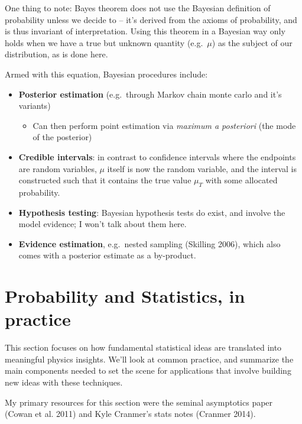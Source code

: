 \documentclass[
  11pt,
  numbers=noendperiod]{book}
\providecommand{\tightlist}{%
  \setlength{\itemsep}{0pt}\setlength{\parskip}{0pt}}\usepackage{longtable,booktabs,array}
\begin{document}
One thing to note: Bayes theorem does not use the Bayesian definition of
probability unless we decide to -- it's derived from the axioms of
probability, and is thus invariant of interpretation. Using this theorem
in a Bayesian way only holds when we have a true but unknown quantity
(e.g.~\(\mu\)) as the subject of our distribution, as is done here.

Armed with this equation, Bayesian procedures include:

\begin{itemize}
\tightlist
\item
  \textbf{Posterior estimation} (e.g.~through Markov chain monte carlo
  and it's variants)

  \begin{itemize}
  \tightlist
  \item
    Can then perform point estimation via \emph{maximum a posteriori}
    (the mode of the posterior)
  \end{itemize}
\item
  \textbf{Credible intervals}: in contrast to confidence intervals where
  the endpoints are random variables, \(\mu\) itself is now the random
  variable, and the interval is constructed such that it contains the
  true value \(\mu_T\) with some allocated probability.
\item
  \textbf{Hypothesis testing}: Bayesian hypothesis tests do exist, and
  involve the model evidence; I won't talk about them here.
\item
  \textbf{Evidence estimation}, e.g.~nested sampling (Skilling 2006),
  which also comes with a posterior estimate as a by-product.
\end{itemize}

\hypertarget{probability-and-statistics-in-practice}{%
\chapter{Probability and Statistics, in
practice}\label{probability-and-statistics-in-practice}}

This section focuses on how fundamental statistical ideas are translated
into meaningful physics insights. We'll look at common practice, and
summarize the main components needed to set the scene for applications
that involve building new ideas with these techniques.

My primary resources for this section were the seminal asymptotics paper
(Cowan et al. 2011) and Kyle Cranmer's stats notes (Cranmer 2014).
\end{document}
